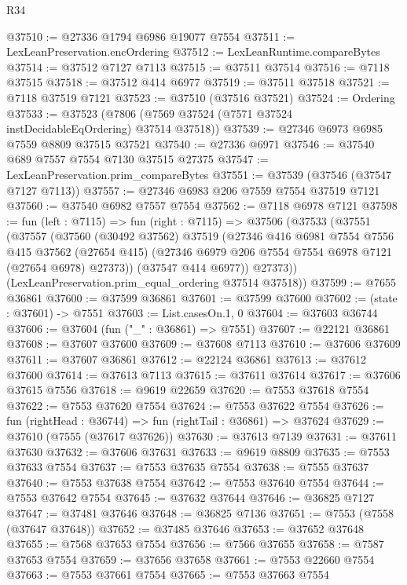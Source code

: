 \begin{lexlean}{R34}
\begin{coremodule}
@37510 := @27336 @1794 @6986 @19077 @7554
@37511 := LexLeanPreservation.encOrdering
@37512 := LexLeanRuntime.compareBytes
@37514 := @37512 @7127 @7113
@37515 := @37511 @37514
@37516 := @7118 @37515
@37518 := @37512 @414 @6977
@37519 := @37511 @37518
@37521 := @7118 @37519 @7121
@37523 := @37510 (@37516 @37521)
@37524 := Ordering
@37533 := @37523 (@7806 (@7569 @37524 (@7571 @37524 instDecidableEqOrdering) @37514 @37518))
@37539 := @27346 @6973 @6985 @7559 @8809 @37515 @37521
@37540 := @27336 @6971
@37546 := @37540 @689 @7557 @7554 @7130 @37515 @27375
@37547 := LexLeanPreservation.prim_compareBytes
@37551 := @37539 (@37546 (@37547 @7127 @7113))
@37557 := @27346 @6983 @206 @7559 @7554 @37519 @7121
@37560 := @37540 @6982 @7557 @7554
@37562 := @7118 @6978 @7121
@37598 := fun (left : @7115) =>
  fun (right : @7115) =>
  @37506
    (@37533
      (@37551
        (@37557
          (@37560
            (@30492 @37562)
            @37519
            (@27346
              @416
              @6981
              @7554
              @7556
              @415
              @37562
              (@27654 @415)
              (@27346 @6979 @206 @7554 @7554 @6978 @7121 (@27654 @6978) @27373))
            (@37547 @414 @6977))
          @27373))
      (LexLeanPreservation.prim_equal_ordering @37514 @37518))
@37599 := @7655 @36861
@37600 := @37599 @36861
@37601 := @37599 @37600
@37602 := (state : @37601) -> @7551
@37603 := List.casesOn.{1, 0}
@37604 := @37603 @36744
@37606 := @37604 (fun ("_" : @36861) => @7551)
@37607 := @22121 @36861
@37608 := @37607 @37600
@37609 := @37608 @7113
@37610 := @37606 @37609
@37611 := @37607 @36861
@37612 := @22124 @36861
@37613 := @37612 @37600
@37614 := @37613 @7113
@37615 := @37611 @37614
@37617 := @37606 @37615 @7556
@37618 := @9619 @22659
@37620 := @7553 @37618 @7554
@37622 := @7553 @37620 @7554
@37624 := @7553 @37622 @7554
@37626 := fun (rightHead : @36744) => fun (rightTail : @36861) => @37624
@37629 := @37610 (@7555 (@37617 @37626))
@37630 := @37613 @7139
@37631 := @37611 @37630
@37632 := @37606 @37631
@37633 := @9619 @8809
@37635 := @7553 @37633 @7554
@37637 := @7553 @37635 @7554
@37638 := @7555 @37637
@37640 := @7553 @37638 @7554
@37642 := @7553 @37640 @7554
@37644 := @7553 @37642 @7554
@37645 := @37632 @37644
@37646 := @36825 @7127
@37647 := @37481 @37646
@37648 := @36825 @7136
@37651 := @7553 (@7558 (@37647 @37648))
@37652 := @37485 @37646
@37653 := @37652 @37648
@37655 := @7568 @37653 @7554
@37656 := @7566 @37655
@37658 := @7587 @37653 @7554
@37659 := @37656 @37658
@37661 := @7553 @22660 @7554
@37663 := @7553 @37661 @7554
@37665 := @7553 @37663 @7554

\end{coremodule}
\end{lexlean}
